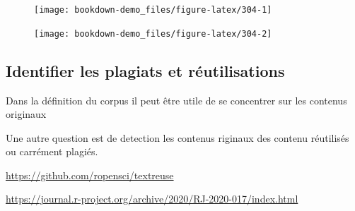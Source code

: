 \documentclass[
]{book}
\newenvironment{Shaded}{\begin{snugshade}}{\end{snugshade}}
\newcommand{\DataTypeTok}[1]{\textcolor[rgb]{0.13,0.29,0.53}{#1}}
\newcommand{\DecValTok}[1]{\textcolor[rgb]{0.00,0.00,0.81}{#1}}
\newcommand{\KeywordTok}[1]{\textcolor[rgb]{0.13,0.29,0.53}{\textbf{#1}}}
\newcommand{\NormalTok}[1]{#1}
\newcommand{\OperatorTok}[1]{\textcolor[rgb]{0.81,0.36,0.00}{\textbf{#1}}}
\newcommand{\StringTok}[1]{\textcolor[rgb]{0.31,0.60,0.02}{#1}}
\begin{document}
\begin{figure}

{\centering \texttt{[image: bookdown-demo\_files/figure-latex/304-1]} 

}

\end{figure}

\begin{Shaded}
\end{Shaded}

\begin{figure}

{\centering \texttt{[image: bookdown-demo\_files/figure-latex/304-2]} 

}

\end{figure}

\hypertarget{identifier-les-plagiats-et-ruxe9utilisations}{%
\subsection{Identifier les plagiats et réutilisations}\label{identifier-les-plagiats-et-ruxe9utilisations}}

Dans la définition du corpus il peut être utile de se concentrer sur les contenus originaux

Une autre question est de detection les contenus riginaux des contenu réutilisés ou carrément plagiés.

\url{https://github.com/ropensci/textreuse}

\url{https://journal.r-project.org/archive/2020/RJ-2020-017/index.html}
\end{document}
